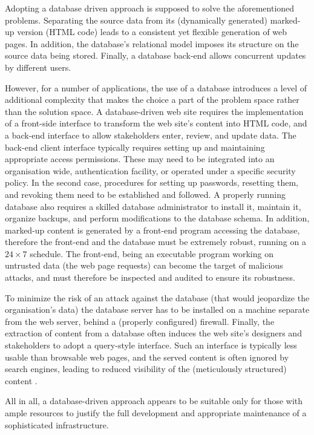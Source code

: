 \documentclass[10pt]{article}
\begin{document}
Adopting a database driven approach is supposed to
solve the aforementioned problems.
Separating the source data from its (dynamically generated)
marked-up version ({\sc HTML} code) leads to a consistent
yet flexible generation of web pages.
In addition, the database's relational model imposes
its structure on the source data being stored.
Finally, a database back-end allows concurrent updates by
different users.

However, for a number of applications, the use of a database
introduces a level of additional complexity that
makes the choice a part of
the problem space rather than the solution space.
A database-driven web site requires the implementation of a
front-side interface to transform the web site's content into
{\sc HTML} code, and a back-end interface to allow stakeholders
enter, review, and update data.
The back-end client interface typically requires setting up
and maintaining appropriate access permissions.
These may need to be integrated into an organisation wide, authentication 
facility, or operated under a specific security policy.
In the second case, procedures for setting up passwords,
resetting them, and revoking them need to be established and followed.
A properly running database also requires a skilled database
administrator to install it, maintain it, organize backups,
and perform modifications to the database schema.
In addition, marked-up content is generated by a front-end
program accessing the database, therefore the front-end and the database
must be extremely robust, running on a $24 \times 7$ schedule.
The front-end, being an executable program working on
untrusted data (the web page requests) can become the target of
malicious attacks,
and must therefore be inspected and audited to ensure its robustness.

To minimize the risk of an attack against the database
(that would jeopardize the organisation's data)
the database server has to be installed on a machine separate
from the web server, behind a (properly configured) firewall.
Finally, the extraction of content from a database often
induces the web site's designers and stakeholders to adopt a
query-style interface.
Such an interface is typically less usable than browsable web pages,
and the served content is often ignored by search engines,
leading to reduced visibility
of the (meticulously structured) content \cite{DEEP_WEB} \cite{JP04}.

All in all, a database-driven approach appears to be suitable
only for those with ample resources to justify the full
development and appropriate maintenance of a sophisticated infrastructure.
\end{document}
